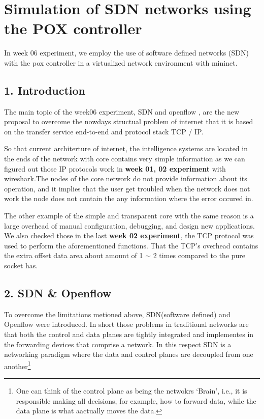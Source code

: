 \section*{Simulation of SDN networks using the POX controller}
In week 06 experiment, we employ the use of software defined networks (SDN) with the pox controller in a virtualized network environment with mininet.
\subsection*{1. Introduction}
The main topic of the week06 experiment, SDN and openflow , are the new proposal to overcome the nowdays structual problem of internet that it is based on the transfer service end-to-end and protocol stack TCP / IP.

So that current architerture of internet, the intelligence systems are located in the ends of the network with core contains very simple information as we can figured out those IP protocols work in \textbf{week 01, 02 experiment} with wireshark.The nodes of the core network do not provide information about its operation, and it implies that the user get troubled when the network does not work the node does not contain the any information where the error occured in.

The other example of the simple and transparent core with the same reason is a large overhead of manual configuration, debugging, and design new applications. 
We also checked those in the last \textbf{week 02 experiment}, the TCP protocol was used to perform the aforementioned functions. 
That the TCP’s overhead contains the extra offset data area about amount of 1 $\sim$ 2 times compared to the pure socket has.

\subsection*{2. SDN \& Openflow}
To overcome the limitations metioned above, SDN(software defined) and Openflow were introduced. In short those problems in traditional networks are that both the control and data planes are tightly integrated and implementes in the forwarding devices that comprise a network. In this respect SDN is a networking paradigm where the data and control planes are decoupled from one another\footnote{One can think of the control plane as being the netwokrs ‘Brain’, i.e., it is responsible making all decisions, for example, how to forward data, while the data plane is what aactually moves the data.} 

